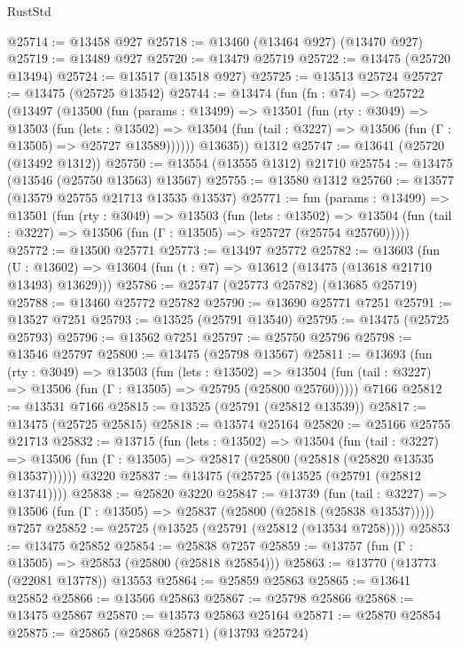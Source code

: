 \begin{lexlean}{RustStd}
\begin{coremodule}
@25714 := @13458 @927
@25718 := @13460 (@13464 @927) (@13470 @927)
@25719 := @13489 @927
@25720 := @13479 @25719
@25722 := @13475 (@25720 @13494)
@25724 := @13517 (@13518 @927)
@25725 := @13513 @25724
@25727 := @13475 (@25725 @13542)
@25744 := @13474
    (fun (fn : @74) =>
    @25722
      (@13497
        (@13500
          (fun (params : @13499) =>
          @13501
            (fun (rty : @3049) =>
            @13503
              (fun (lets : @13502) =>
              @13504 (fun (tail : @3227) => @13506 (fun (Γ : @13505) => @25727 @13589))))))
        @13635))
    @1312
@25747 := @13641 (@25720 (@13492 @1312))
@25750 := @13554 (@13555 @1312) @21710
@25754 := @13475 (@13546 (@25750 @13563) @13567)
@25755 := @13580 @1312
@25760 := @13577 (@13579 @25755 @21713 @13535 @13537)
@25771 := fun (params : @13499) =>
  @13501
    (fun (rty : @3049) =>
    @13503
      (fun (lets : @13502) =>
      @13504 (fun (tail : @3227) => @13506 (fun (Γ : @13505) => @25727 (@25754 @25760)))))
@25772 := @13500 @25771
@25773 := @13497 @25772
@25782 := @13603
    (fun (U : @13602) => @13604 (fun (t : @7) => @13612 (@13475 (@13618 @21710 @13493) @13629)))
@25786 := @25747 (@25773 @25782) (@13685 @25719)
@25788 := @13460 @25772 @25782
@25790 := @13690 @25771 @7251
@25791 := @13527 @7251
@25793 := @13525 (@25791 @13540)
@25795 := @13475 (@25725 @25793)
@25796 := @13562 @7251
@25797 := @25750 @25796
@25798 := @13546 @25797
@25800 := @13475 (@25798 @13567)
@25811 := @13693
    (fun (rty : @3049) =>
    @13503
      (fun (lets : @13502) =>
      @13504 (fun (tail : @3227) => @13506 (fun (Γ : @13505) => @25795 (@25800 @25760)))))
    @7166
@25812 := @13531 @7166
@25815 := @13525 (@25791 (@25812 @13539))
@25817 := @13475 (@25725 @25815)
@25818 := @13574 @25164
@25820 := @25166 @25755 @21713
@25832 := @13715
    (fun (lets : @13502) =>
    @13504
      (fun (tail : @3227) =>
      @13506 (fun (Γ : @13505) => @25817 (@25800 (@25818 (@25820 @13535 @13537))))))
    @3220
@25837 := @13475 (@25725 (@13525 (@25791 (@25812 @13741))))
@25838 := @25820 @3220
@25847 := @13739
    (fun (tail : @3227) => @13506 (fun (Γ : @13505) => @25837 (@25800 (@25818 (@25838 @13537)))))
    @7257
@25852 := @25725 (@13525 (@25791 (@25812 (@13534 @7258))))
@25853 := @13475 @25852
@25854 := @25838 @7257
@25859 := @13757 (fun (Γ : @13505) => @25853 (@25800 (@25818 @25854)))
@25863 := @13770 (@13773 (@22081 @13778)) @13553
@25864 := @25859 @25863
@25865 := @13641 @25852
@25866 := @13566 @25863
@25867 := @25798 @25866
@25868 := @13475 @25867
@25870 := @13573 @25863 @25164
@25871 := @25870 @25854
@25875 := @25865 (@25868 @25871) (@13793 @25724)

\end{coremodule}
\end{lexlean}
